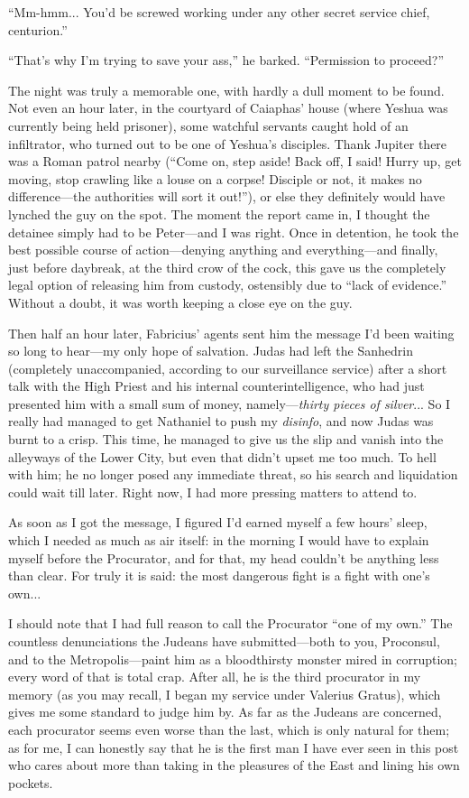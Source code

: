 ``Mm-hmm... You'd be screwed working under any other secret service chief, centurion.''

``That's why I'm trying to save your ass,'' he barked. ``Permission to proceed?''

The night was truly a memorable one, with hardly a dull moment to be found. Not even an hour later, in the courtyard of Caiaphas' house (where Yeshua was currently being held prisoner), some watchful servants caught hold of an infiltrator, who turned out to be one of Yeshua's disciples. Thank Jupiter there was a Roman patrol nearby (``Come on, step aside! Back off, I said! Hurry up, get moving, stop crawling like a louse on a corpse! Disciple or not, it makes no difference---the authorities will sort it out!''), or else they definitely would have lynched the guy on the spot. The moment the report came in, I thought the detainee simply had to be Peter---and I was right. Once in detention, he took the best possible course of action---denying anything and everything---and finally, just before daybreak, at the third crow of the cock, this gave us the completely legal option of releasing him from custody, ostensibly due to ``lack of evidence.'' Without a doubt, it was worth keeping a close eye on the guy.

Then half an hour later, Fabricius' agents sent him the message I'd been waiting so long to hear---my only hope of salvation. Judas had left the Sanhedrin (completely unaccompanied, according to our surveillance service) after a short talk with the High Priest and his internal counterintelligence, who had just presented him with a small sum of money, namely---\emph{thirty pieces of silver}... So I really had managed to get Nathaniel to push my \emph{disinfo}, and now Judas was burnt to a crisp. This time, he managed to give us the slip and vanish into the alleyways of the Lower City, but even that didn't upset me too much. To hell with him; he no longer posed any immediate threat, so his search and liquidation could wait till later. Right now, I had more pressing matters to attend to.

As soon as I got the message, I figured I'd earned myself a few hours' sleep, which I needed as much as air itself: in the morning I would have to explain myself before the Procurator, and for that, my head couldn't be anything less than clear. For truly it is said: the most dangerous fight is a fight with one's own...

I should note that I had full reason to call the Procurator ``one of my own.'' The countless denunciations the Judeans have submitted---both to you, Proconsul, and to the Metropolis---paint him as a bloodthirsty monster mired in corruption; every word of that is total crap. After all, he is the third procurator in my memory (as you may recall, I began my service under Valerius Gratus), which gives me some standard to judge him by. As far as the Judeans are concerned, each procurator seems even worse than the last, which is only natural for them; as for me, I can honestly say that he is the first man I have ever seen in this post who cares about more than taking in the pleasures of the East and lining his own pockets.

